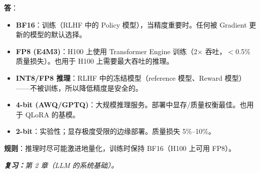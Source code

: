 \begin{questionbox}
\textbf{答}：

\begin{itemize}
  \item \textbf{BF16}：训练（RLHF 中的 Policy 模型），当精度重要时。任何被 Gradient 更新的模型的默认选择。
  \item \textbf{FP8 (E4M3)}：H100 上使用 Transformer Engine 训练（2$\times$ 吞吐，$<$0.5\% 质量损失）。也用于 H100 上需要最大吞吐的推理。
  \item \textbf{INT8/FP8 推理}：RLHF 中的冻结模型（reference 模型、Reward 模型）——不被训练，所以降低精度是安全的。
  \item \textbf{4-bit (AWQ/GPTQ)}：大规模推理服务。部署中显存/质量权衡最佳。也用于 QLoRA 的基模。
  \item \textbf{2-bit}：实验性；显存极度受限的边缘部署。质量损失 5\%--10\%。
\end{itemize}

\textbf{规则}：推理时尽可能激进地量化，训练时保持 BF16（H100 上可用 FP8）。

\emph{\textbf{复习：}第 2 章（LLM 的系统基础）。}
\end{questionbox}

